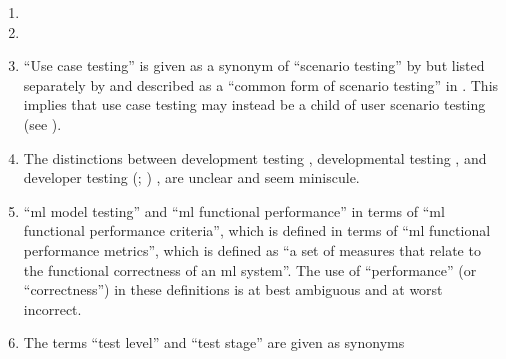\begin{enumerate}
    \item %
          \tourFlaw{}
    \item %
          \alphaFlaw{}
    \item %
          ``Use case testing'' is given as a synonym of ``scenario testing''
          by \citetISTQB{}
          but listed separately by
          \citet[Fig.~2]{IEEE2022} and described as a ``common form of scenario
          testing'' in \citeyearpar[p.~20]{IEEE2021}.
          This implies that use case testing may instead be a child of
          user scenario testing (see ).
    \item %
          The distinctions between development testing \citep[p.~136]{IEEE2017},
          developmental testing \citep[p.~30]{Firesmith2015}, and developer
          testing
          \ifnotpaper
              (\citealp[p.~39]{Firesmith2015}; \citealp[p.~11]{Gerrard2000a})
          \else
              \cite[p.~39]{Firesmith2015}, \cite[p.~11]{Gerrard2000a}
          \fi are unclear and seem miniscule.
    \item %
           \citetISTQB{} 
          ``\acf{ml} model testing'' and ``\acs{ml} functional performance''
          in terms of ``\acs{ml} functional performance criteria'',
          which is defined in terms of ``\acs{ml} functional performance
          metrics'', which is defined as ``a set of measures that relate to the
          functional correctness of an \acs{ml} system''. The use
          of ``performance'' (or ``correctness'') in these definitions is at
          best ambiguous and at worst incorrect.
    \item %
          The terms ``test level'' and ``test stage'' are given as synonyms

\end{enumerate}

